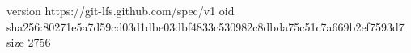 version https://git-lfs.github.com/spec/v1
oid sha256:80271e5a7d59cd03d1dbe03dbf4833c530982c8dbda75c51c7a669b2ef7593d7
size 2756
